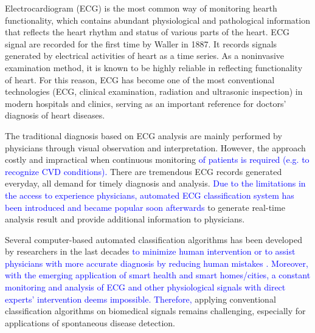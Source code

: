 Electrocardiogram (ECG) is the most common way of monitoring hearth functionality, which %
contains abundant physiological and pathological information that reflects the heart rhythm and status of various parts of the heart. ECG signal are recorded for the first time by Waller in 1887\cite{besterman1979waller}. %
It records signals generated by electrical activities of heart as a time series. As a noninvasive examination method, it is known to be highly reliable in reflecting functionality of heart. For this reason, ECG has become one of the most conventional technologies (ECG, clinical examination, radiation and ultrasonic inspection) in modern hospitals and clinics, serving as an important reference for doctors' diagnosis of heart diseases\cite{kreger1987electrocardiogram}.


The traditional diagnosis based on ECG analysis are mainly performed by physicians through visual observation and interpretation.%
However, the approach costly and impractical when continuous monitoring \textcolor{blue}{of patients is required (e.g. to recognize CVD conditions).}%
There are tremendous ECG records generated everyday, all demand for timely diagnosis and analysis. %
\textcolor{blue}{Due to the limitations in the access to experience physicians, automated  ECG classification system has been introduced and became popular soon afterwards} to generate real-time analysis result and provide additional information to physicians. 

Several computer-based automated classification algorithms has been developed by researchers in the last decades \textcolor{blue}{to minimize human intervention or to assist physicians with more accurate diagnosis by reducing human mistakes \cite{lagerholm2000clustering, prasad2003classification, autofs, ceylan2009novel, osowski2004support, Hu_et_al,deChazal2006,llamedo2012automatic,bbnn,ince2009generic,Kiranyaz}.} \textcolor{blue}{Moreover, with the emerging application of smart health and smart homes/cities, a constant monitoring and analysis of ECG and other physiological signals with direct experts' intervention deems impossible. Therefore,} applying conventional classification algorithms on biomedical signals remains challenging, especially for applications of spontaneous disease detection. 


